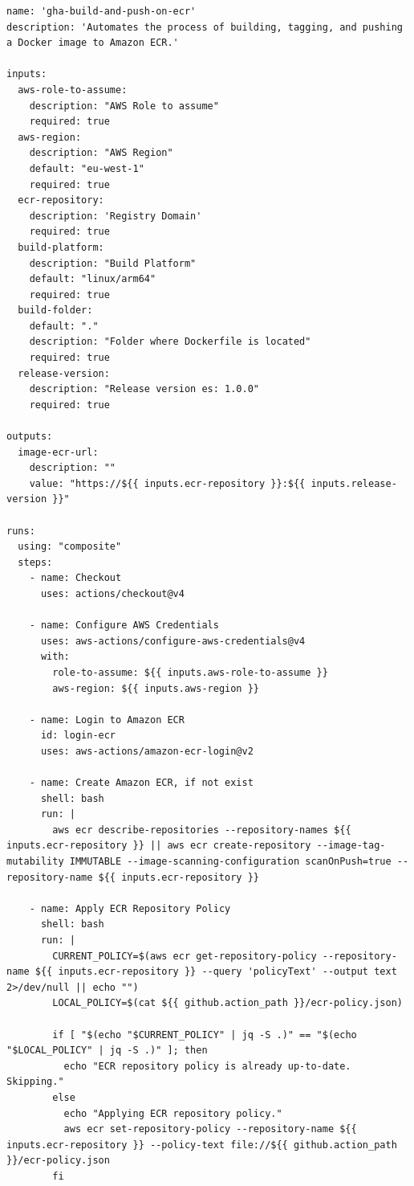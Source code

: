 \begin{lstlisting}[label={lst:ecr-composite-action}]
name: 'gha-build-and-push-on-ecr'
description: 'Automates the process of building, tagging, and pushing a Docker image to Amazon ECR.'

inputs:
  aws-role-to-assume:
    description: "AWS Role to assume"
    required: true
  aws-region:
    description: "AWS Region"
    default: "eu-west-1"
    required: true
  ecr-repository:
    description: 'Registry Domain'
    required: true
  build-platform:
    description: "Build Platform"
    default: "linux/arm64"
    required: true
  build-folder:
    default: "."
    description: "Folder where Dockerfile is located"
    required: true
  release-version:
    description: "Release version es: 1.0.0"
    required: true

outputs:
  image-ecr-url:
    description: ""
    value: "https://${{ inputs.ecr-repository }}:${{ inputs.release-version }}"

runs:
  using: "composite"
  steps:
    - name: Checkout
      uses: actions/checkout@v4
      
    - name: Configure AWS Credentials
      uses: aws-actions/configure-aws-credentials@v4
      with:
        role-to-assume: ${{ inputs.aws-role-to-assume }}
        aws-region: ${{ inputs.aws-region }}
        
    - name: Login to Amazon ECR
      id: login-ecr
      uses: aws-actions/amazon-ecr-login@v2
      
    - name: Create Amazon ECR, if not exist
      shell: bash
      run: |
        aws ecr describe-repositories --repository-names ${{ inputs.ecr-repository }} || aws ecr create-repository --image-tag-mutability IMMUTABLE --image-scanning-configuration scanOnPush=true --repository-name ${{ inputs.ecr-repository }}
        
    - name: Apply ECR Repository Policy
      shell: bash
      run: |
        CURRENT_POLICY=$(aws ecr get-repository-policy --repository-name ${{ inputs.ecr-repository }} --query 'policyText' --output text 2>/dev/null || echo "")
        LOCAL_POLICY=$(cat ${{ github.action_path }}/ecr-policy.json)

        if [ "$(echo "$CURRENT_POLICY" | jq -S .)" == "$(echo "$LOCAL_POLICY" | jq -S .)" ]; then
          echo "ECR repository policy is already up-to-date. Skipping."
        else
          echo "Applying ECR repository policy."
          aws ecr set-repository-policy --repository-name ${{ inputs.ecr-repository }} --policy-text file://${{ github.action_path }}/ecr-policy.json
        fi
        

\end{lstlisting}
